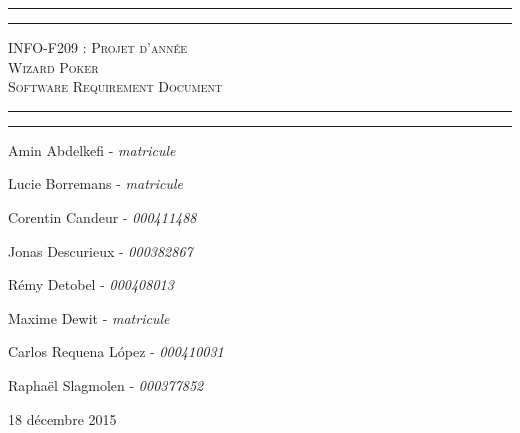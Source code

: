 \begin{titlepage}

\begin{center}
    \vspace*{\fill}
        \hrule
        \vspace*{2pt}
        \hrule
        \vspace*{15pt}
        \textsc{\Huge{INFO-F209 : Projet d'année \\\vspace*{8pt}
            Wizard Poker\\\vspace*{12pt}
            Software Requirement Document}}
        \vspace*{15pt}
        \hrule
        \vspace*{2pt}
        \hrule
  \vspace*{\fill}
\end{center}
\null
\vfill

\hfill Amin Abdelkefi - \emph{matricule}

\hfill Lucie Borremans - \emph{matricule}

\hfill Corentin Candeur - \emph{000411488}

\hfill Jonas Descurieux - \emph{000382867}

\hfill Rémy Detobel - \emph{000408013}

\hfill Maxime Dewit - \emph{matricule}

\hfill Carlos Requena López - \emph{000410031}

\hfill Raphaël Slagmolen - \emph{000377852}

\large 18 décembre 2015

\end{titlepage}
